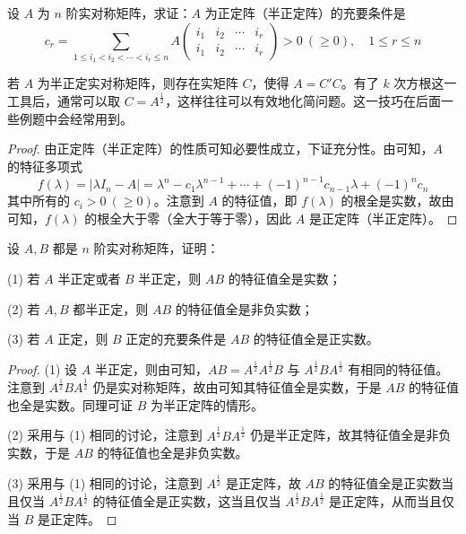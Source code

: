 \documentclass[../../main.tex]{subfiles}%
\begin{document}
\begin{proposition}\label{proposition:例9.63}
设 \(A\) 为 \(n\) 阶实对称矩阵，求证：\(A\) 为正定阵（半正定阵）的充要条件是
\[
c_r = \sum_{1\leqslant  i_1 < i_2 < \cdots < i_r \leqslant  n}A\begin{pmatrix}
i_1 & i_2 & \cdots & i_r \\
i_1 & i_2 & \cdots & i_r
\end{pmatrix} > 0\ (\geqslant  0),\quad 1\leqslant  r \leqslant  n
\]
\end{proposition}
\begin{remark}
若 \(A\) 为半正定实对称矩阵，则存在实矩阵 \(C\)，使得 \(A = C'C\)。有了 \(k\) 次方根这一工具后，通常可以取 \(C = A^{\frac{1}{2}}\)，这样往往可以有效地化简问题。这一技巧在后面一些例题中会经常用到。 
\end{remark}
\begin{proof}

由正定阵（半正定阵）的性质可知必要性成立，下证充分性。由可知，\(A\) 的特征多项式
\[
f(\lambda) = |\lambda I_n - A| = \lambda^n - c_1\lambda^{n - 1} + \cdots + (-1)^{n - 1}c_{n - 1}\lambda + (-1)^nc_n
\]
其中所有的 \(c_i > 0\ (\geqslant  0)\)。注意到 \(A\) 的特征值，即 \(f(\lambda)\) 的根全是实数，故由可知，\(f(\lambda)\) 的根全大于零（全大于等于零），因此 \(A\) 是正定阵（半正定阵）。

\end{proof}

\begin{proposition}\label{proposition:例9.64}
设 \(A,B\) 都是 \(n\) 阶实对称矩阵，证明：

(1) 若 \(A\) 半正定或者 \(B\) 半正定，则 \(AB\) 的特征值全是实数；

(2) 若 \(A,B\) 都半正定，则 \(AB\) 的特征值全是非负实数；

(3) 若 \(A\) 正定，则 \(B\) 正定的充要条件是 \(AB\) 的特征值全是正实数。
\end{proposition}
\begin{proof}

(1) 设 \(A\) 半正定，则由可知，\(AB = A^{\frac{1}{2}}A^{\frac{1}{2}}B\) 与 \(A^{\frac{1}{2}}BA^{\frac{1}{2}}\) 有相同的特征值。注意到 \(A^{\frac{1}{2}}BA^{\frac{1}{2}}\) 仍是实对称矩阵，故由可知其特征值全是实数，于是 \(AB\) 的特征值也全是实数。同理可证 \(B\) 为半正定阵的情形。

(2) 采用与 (1) 相同的讨论，注意到 \(A^{\frac{1}{2}}BA^{\frac{1}{2}}\) 仍是半正定阵，故其特征值全是非负实数，于是 \(AB\) 的特征值也全是非负实数。

(3) 采用与 (1) 相同的讨论，注意到 \(A^{\frac{1}{2}}\) 是正定阵，故 \(AB\) 的特征值全是正实数当且仅当 \(A^{\frac{1}{2}}BA^{\frac{1}{2}}\) 的特征值全是正实数，这当且仅当 \(A^{\frac{1}{2}}BA^{\frac{1}{2}}\) 是正定阵，从而当且仅当 \(B\) 是正定阵。 

\end{proof}
\end{document}

